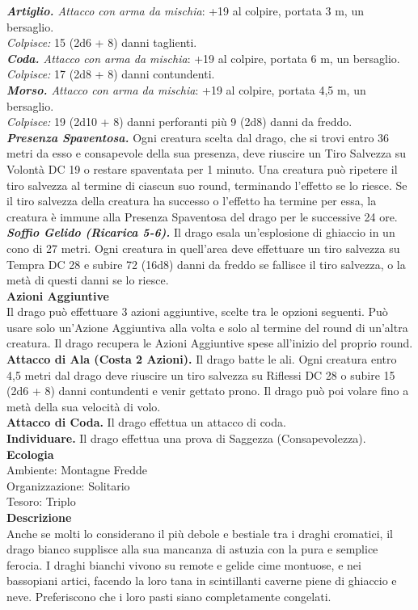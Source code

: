 \begin{multicols}{2}
\emph{\textbf{Artiglio.} Attacco con arma da mischia}: +19 al colpire, portata 3 m, un bersaglio.\\
\emph{Colpisce:} 15 (2d6 + 8) danni taglienti.\\
\emph{\textbf{Coda.} Attacco con arma da mischia}: +19 al colpire, portata 6 m, un bersaglio.\\
\emph{Colpisce:} 17 (2d8 + 8) danni contundenti. \\
\emph{\textbf{Morso.} Attacco con arma da mischia}: +19 al colpire, portata 4,5 m, un bersaglio.\\
\emph{Colpisce:} 19 (2d10 + 8) danni perforanti più 9 (2d8) danni da freddo.\\
\emph{\textbf{Presenza Spaventosa.}} Ogni creatura scelta dal drago, che si trovi entro 36 metri da esso e consapevole della sua presenza, deve riuscire un Tiro Salvezza su Volontà DC  19 o restare spaventata per 1 minuto. Una creatura può ripetere il tiro salvezza al termine di ciascun suo round, terminando l'effetto se lo riesce. Se il tiro salvezza della creatura ha successo o l'effetto ha termine per essa, la creatura è immune alla Presenza Spaventosa del drago per le successive 24 ore.\\
\emph{\textbf{Soffio Gelido (Ricarica 5-6).}} Il drago esala un'esplosione di ghiaccio in un cono di 27 metri. Ogni creatura in quell'area deve effettuare un tiro salvezza su Tempra DC  28 e subire 72 (16d8) danni da freddo se fallisce il tiro salvezza, o la metà di questi danni se lo riesce.\\
\textbf{Azioni Aggiuntive}\\
Il drago può effettuare 3 azioni aggiuntive, scelte tra le opzioni seguenti. Può usare solo un'Azione Aggiuntiva alla volta e solo al termine del round di un'altra creatura. Il drago recupera le Azioni Aggiuntive spese all'inizio del proprio round.\\
\textbf{Attacco di Ala (Costa 2 Azioni).} Il drago batte le ali. Ogni creatura entro 4,5 metri dal drago deve riuscire un tiro salvezza su Riflessi DC  28 o subire 15 (2d6 + 8) danni contundenti e venir gettato prono. Il drago può poi volare fino a metà della sua velocità di volo.\\
\textbf{Attacco di Coda.} Il drago effettua un attacco di coda.\\
\textbf{Individuare.} Il drago effettua una prova di Saggezza (Consapevolezza).\\
\textbf{Ecologia}\\
Ambiente: Montagne Fredde\\
Organizzazione: Solitario\\
Tesoro: Triplo\\
\textbf{Descrizione}\\
Anche se molti lo considerano il più debole e bestiale tra i draghi cromatici, il drago bianco supplisce alla sua mancanza di astuzia con la pura e semplice ferocia. I draghi bianchi vivono su remote e gelide cime montuose, e nei bassopiani artici, facendo la loro tana in scintillanti caverne piene di ghiaccio e neve. Preferiscono che i loro pasti siano completamente congelati.\\


\end{multicols}
